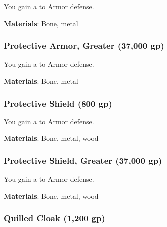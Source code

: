 You gain a   to Armor defense.



\vspace{0.25em}
\textbf{Materials}: Bone, metal


\lowercase{\hypertarget{item:Protective Armor, Greater}{}}\label{item:Protective Armor, Greater}
\hypertarget{item:Protective Armor, Greater}{\subsubsection{Protective Armor, Greater\hfill{} (37,000 gp)}}

You gain a   to Armor defense.



\vspace{0.25em}
\textbf{Materials}: Bone, metal


\lowercase{\hypertarget{item:Protective Shield}{}}\label{item:Protective Shield}
\hypertarget{item:Protective Shield}{\subsubsection{Protective Shield\hfill{} (800 gp)}}

You gain a   to Armor defense.



\vspace{0.25em}
\textbf{Materials}: Bone, metal, wood


\lowercase{\hypertarget{item:Protective Shield, Greater}{}}\label{item:Protective Shield, Greater}
\hypertarget{item:Protective Shield, Greater}{\subsubsection{Protective Shield, Greater\hfill{} (37,000 gp)}}

You gain a   to Armor defense.



\vspace{0.25em}
\textbf{Materials}: Bone, metal, wood


\lowercase{\hypertarget{item:Quilled Cloak}{}}\label{item:Quilled Cloak}
\hypertarget{item:Quilled Cloak}{\subsubsection{Quilled Cloak\hfill{} (1,200 gp)}}

